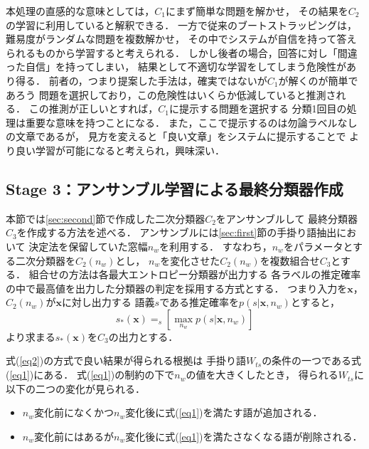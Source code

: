 \documentclass[japanese]{jnlp_1.4}
\newcommand{\argmax}{}
\begin{document}
本処理の直感的な意味としては，$C_1$にまず簡単な問題を解かせ，
その結果を$C_2$の学習に利用していると解釈できる．
一方で従来のブートストラッピングは，難易度がランダムな問題を複数解かせ，
その中でシステムが自信を持って答えられるものから学習すると考えられる．
しかし後者の場合，回答に対し「間違った自信」を持ってしまい，
結果として不適切な学習をしてしまう危険性があり得る．
前者の，つまり提案した手法は，確実ではないが$C_1$が解くのが簡単であろう
問題を選択しており，この危険性はいくらか低減していると推測される．
この推測が正しいとすれば，$C_1$に提示する問題を選択する
分類1回目の処理は重要な意味を持つことになる．
また，ここで提示するのは勿論ラベルなしの文章であるが，
見方を変えると「良い文章」をシステムに提示することで
より良い学習が可能になると考えられ，興味深い．



\subsection{Stage 3：アンサンブル学習による最終分類器作成}
\label{sec:third}

本節では\ref{sec:second}節で作成した二次分類器$C_2$をアンサンブルして
最終分類器$C_3$を作成する方法を述べる．
アンサンブルには\ref{sec:first}節の手掛り語抽出において
決定法を保留していた窓幅$n_w$を利用する．
すなわち，$n_w$をパラメータとする二次分類器を$C_2(n_w)$とし，
$n_w$を変化させた$C_2(n_w)$を複数組合せ$C_3$とする．
組合せの方法は各最大エントロピー分類器が出力する
各ラベルの推定確率の中で最高値を出力した分類器の判定を採用する方式とする．
つまり入力を$\mathbf{x}$，$C_2(n_w)$が$\mathbf{x}$に対し出力する
語義$s$である推定確率を$p(s|\mathbf{x},n_w)$とすると，
\begin{equation}
s_*(\mathbf{x})=\argmax_{s} \left[ \max_{n_w}p(s|\mathbf{x},n_w) \right]
\label{eq2}
\end{equation}
より求まる$s_*(\mathbf{x})$を$C_3$の出力とする．

式(\ref{eq2})の方式で良い結果が得られる根拠は
手掛り語$W_{ts}$の条件の一つである式(\ref{eq1})にある．
式(\ref{eq1})の制約の下で$n_w$の値を大きくしたとき，
得られる$W_{ts}$に以下の二つの変化が見られる．

\begin{itemize}
\item $n_w$変化前になくかつ$n_w$変化後に式(\ref{eq1})を満たす語が追加される．
\item $n_w$変化前にはあるが$n_w$変化後に式(\ref{eq1})を満たさなくなる語が削除される．
\end{itemize}
\end{document}
